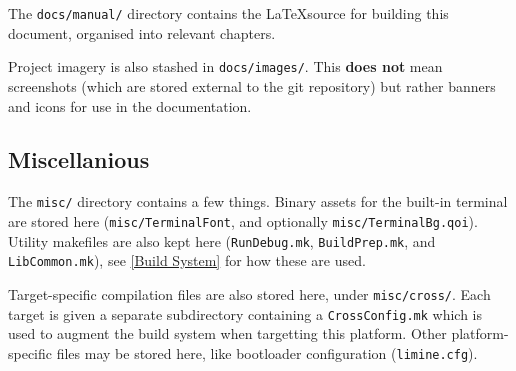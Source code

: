 The \verb|docs/manual/| directory contains the \LaTeX \hspace{0.25em}source for building this document, organised into relevant chapters.

Project imagery is also stashed in \verb|docs/images/|. This \textbf{does not} mean screenshots (which are stored external to the git repository) but rather banners and icons for use in the documentation.

\subsection{Miscellanious}
The \verb|misc/| directory contains a few things. Binary assets for the built-in terminal are stored here (\verb|misc/TerminalFont|, and optionally \verb|misc/TerminalBg.qoi|). Utility makefiles are also kept here (\verb|RunDebug.mk|, \verb|BuildPrep.mk|, and \verb|LibCommon.mk|), see \autoref{Build System} for how these are used.

Target-specific compilation files are also stored here, under \verb|misc/cross/|. Each target is given a separate subdirectory containing a \verb|CrossConfig.mk| which is used to augment the build system when targetting this platform. Other platform-specific files may be stored here, like bootloader configuration (\verb|limine.cfg|).
